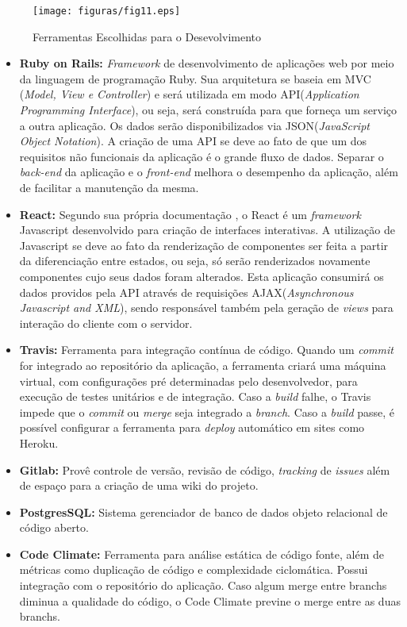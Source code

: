 \begin{figure}[H]
	\centering
	\texttt{[image: figuras/fig11.eps]}
	\caption{Ferramentas Escolhidas para o Desevolvimento}
	\label{fig11}
\end{figure}

\begin{itemize}

  \item \textbf{Ruby on Rails:} \textit{Framework} de desenvolvimento de aplicações web por meio da linguagem de programação Ruby. Sua arquitetura se baseia em MVC (\textit{Model, View e Controller}) e será utilizada em modo API(\textit{Application Programming Interface}), ou seja, será construída para que forneça um serviço a outra aplicação. Os dados serão disponibilizados via JSON(\textit{JavaScript Object Notation}). A criação de uma API se deve ao fato de que um dos requisitos não funcionais da aplicação é o grande fluxo de dados. Separar o \textit{back-end} da aplicação e o \textit{front-end} melhora o desempenho da aplicação, além de facilitar a manutenção da mesma.

  \item \textbf{React:} Segundo sua própria documentação \cite{React:2014}, o React é um \textit{framework} Javascript desenvolvido para criação de interfaces interativas. A utilização de Javascript se deve ao fato da renderização de componentes ser feita a partir da diferenciação entre estados, ou seja, só serão renderizados novamente componentes cujo seus dados foram alterados. Esta aplicação consumirá os dados providos pela API através de requisições AJAX(\textit{Asynchronous Javascript and XML}), sendo responsável também pela geração de \textit{views} para interação do cliente com o servidor.

  \item \textbf{Travis:} Ferramenta para integração contínua de código. Quando um \textit{commit} for integrado ao repositório da aplicação, a ferramenta criará uma máquina virtual, com configurações pré determinadas pelo desenvolvedor, para execução de testes unitários e de integração. Caso a \textit{build} falhe, o Travis impede que o \textit{commit} ou \textit{merge} seja integrado a \textit{branch}. Caso a \textit{build} passe, é possível configurar a ferramenta para \textit{deploy} automático em sites como Heroku.

  \item \textbf{Gitlab:} Provê controle de versão, revisão de código, \textit{tracking} de \textit{issues} além de espaço para a criação de uma wiki do projeto.

  \item \textbf{PostgresSQL:} Sistema gerenciador de banco de dados objeto relacional de código aberto.

  \item \textbf{Code Climate:} Ferramenta para análise estática de código fonte, além de métricas como duplicação de código e complexidade ciclomática. Possui integração com o repositório do aplicação. Caso algum merge entre branchs diminua a qualidade do código, o Code Climate previne o merge entre as duas branchs.

\end{itemize}


